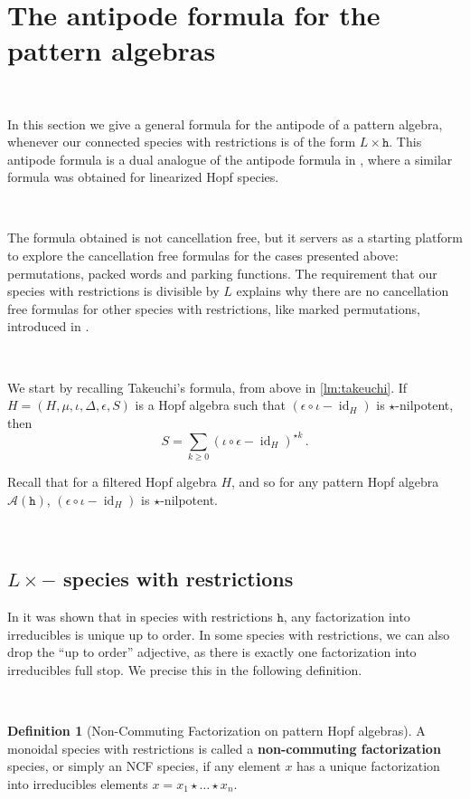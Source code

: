 \documentclass[12pt, reqno]{amsart}
\theoremstyle{definition}
\newtheorem{defin}[thm]{Definition}
\DeclareMathOperator{\id}{id}
\begin{document}
\

\section{The antipode formula for the pattern algebras \label{sec:formula_general}}
\

In this section we give a general formula for the antipode of a pattern algebra, whenever our connected species with restrictions is of the form $L \times \mathtt{h}$. This antipode formula is a dual analogue of the antipode formula in \cite{BergeronBenedetti}, where a similar formula was obtained for linearized Hopf species.

\

The formula obtained is not cancellation free, but it servers as a starting platform to explore the cancellation free formulas for the cases presented above: permutations, packed words and parking functions. The requirement that our species with restrictions is divisible by $L$ explains why there are no cancellation free formulas for other species with restrictions, like marked permutations, introduced in \cite{Penaguiao2020}.

\

We start by recalling Takeuchi's formula, from above in \cref{lm:takeuchi}.
If $H = (H, \mu, \iota, \Delta, \epsilon, S)$ is a Hopf algebra such that $(\epsilon\circ \iota - \id_H)$ is $\star$-nilpotent, then 
$$S = \sum_{k\geq 0 }  ( \iota  \circ\epsilon- \id_H)^{\star k}\, . $$

Recall that for a filtered Hopf algebra $H$, and so for any pattern Hopf algebra $\mathcal A (\mathtt{h})$, $(\epsilon\circ \iota - \id_H)$ is $\star$-nilpotent. 

\

\subsection{$L\times -$ species with restrictions}


In \cite[Corollary 3.4.]{Penaguiao2020} it was shown that in species with restrictions $\mathtt{h}$, any factorization into irreducibles is unique up to order.
In some species with restrictions, we can also drop the ``up to order'' adjective, as there is exactly one factorization into irreducibles full stop. We precise this in the following definition.

\

\begin{defin}[Non-Commuting Factorization on pattern Hopf algebras]
A monoidal species with restrictions is called a \textbf{non-commuting factorization} species, or simply an NCF species, if any element $x$ has a unique factorization into irreducibles elements $x = x_1 \star \dots \star x_n$.
\end{defin}
\end{document}
